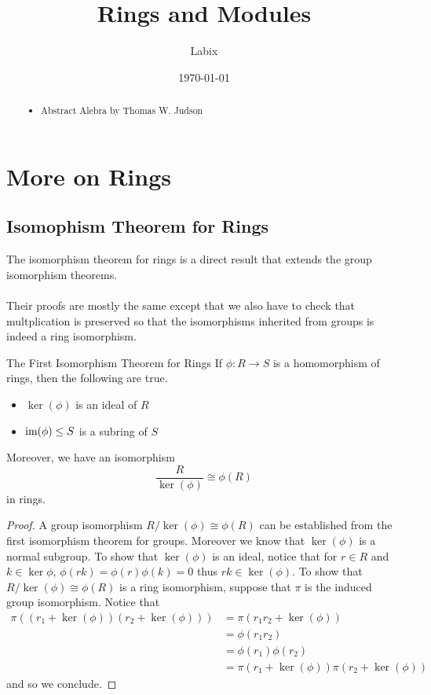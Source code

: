 \documentclass[a4paper]{article}
\title{Rings and Modules}
\author{Labix}
\date{\today}
\begin{document}
\maketitle
\begin{abstract}
\begin{itemize}
\item Abstract Alebra by Thomas W. Judson
\end{itemize}
\end{abstract}
\pagebreak
\tableofcontents
\pagebreak

\section{More on Rings}
\subsection{Isomophism Theorem for Rings}
The isomorphism theorem for rings is a direct result that extends the group isomorphism theorems. \\~\\ Their proofs are mostly the same except that we also have to check that multplication is preserved so that the isomorphisms inherited from groups is indeed a ring isomorphism. 

\begin{thm}{The First Isomorphism Theorem for Rings}{} If $\phi:R\to S$ is a homomorphism of rings, then the following are true. 
\begin{itemize}
\item $\ker(\phi)$ is an ideal of $R$
\item $\operatorname{im}(\phi)\leq S$ is a subring of $S$
\end{itemize}
Moreover, we have an isomorphism $$\frac{R}{\ker(\phi)}\cong\phi(R)$$ in rings. \tcbline
\begin{proof}
A group isomorphism $R/\ker(\phi)\cong\phi(R)$ can be established from the first isomorphism theorem for groups. Moreover we know that $\ker(\phi)$ is a normal subgroup. To show that $\ker(\phi)$ is an ideal, notice that for $r\in R$ and $k\in\ker\phi$, $\phi(rk)=\phi(r)\phi(k)=0$ thus $rk\in\ker(\phi)$. To show that $R/\ker(\phi)\cong\phi(R)$ is a ring isomorphism, suppose that $\pi$ is the induced group isomorphism. Notice that 
\begin{align*}
\pi((r_1+\ker(\phi))(r_2+\ker(\phi)))&=\pi(r_1r_2+\ker(\phi))\\
&=\phi(r_1r_2)\\
&=\phi(r_1)\phi(r_2)\\
&=\pi(r_1+\ker(\phi))\pi(r_2+\ker(\phi))
\end{align*}
and so we conclude. 
\end{proof}
\end{thm}
\end{document}
